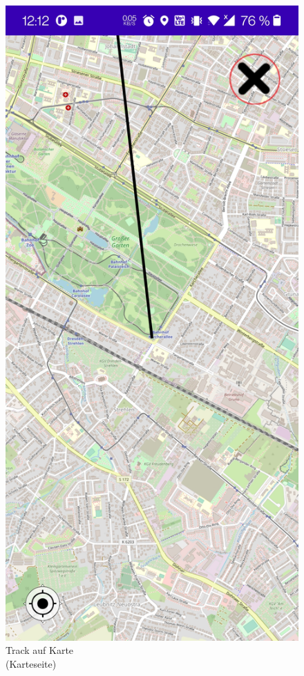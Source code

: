 \documentclass{article}
\begin{document}
\begin{figure}[H]
		\endminipage\hfill
		  \includegraphics[scale=0.15]{7_anzeigen2.jpg}
		  \centering
		  \caption{Track auf Karte \\(Karteseite)}
		\endminipage\hfill
	\end{figure}
	\newpage
\end{document}
